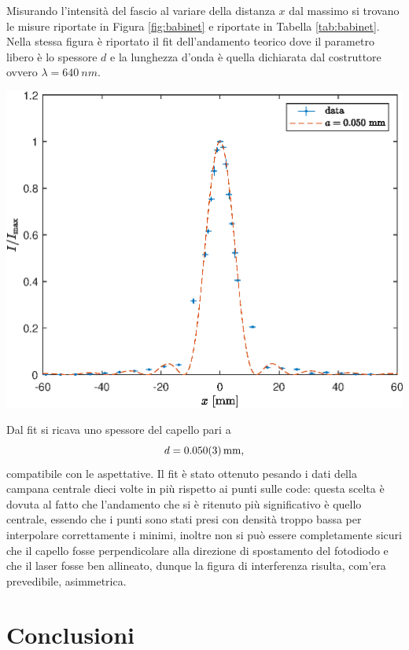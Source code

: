 \documentclass[10pt,oneside,a4paper]{article}
\newenvironment{Figure}
  {\par\medskip\noindent\minipage{\linewidth}}
  {\endminipage\par\medskip}
\begin{document}
\begin{multicols}{2}
Misurando l'intensità del fascio al variare della distanza $x$ dal massimo si trovano le misure riportate in Figura \ref{fig:babinet} e riportate in Tabella \ref{tab:babinet}. Nella stessa figura è riportato il fit dell'andamento teorico dove il parametro libero è lo spessore $d$ e la lunghezza d'onda è quella dichiarata dal costruttore ovvero $\lambda = \SI{640}{nm}$.
\begin{Figure}
	\begin{center}
	\includegraphics[width=\linewidth]{babinet.eps}
	\label{fig:babinet}
	\end{center}
\end{Figure}

Dal fit si ricava uno spessore del capello pari a 
\[
	d = \SI{0.050 \pm 0.003}{mm},
\]
compatibile con le aspettative.
Il fit è stato ottenuto pesando i dati della campana centrale dieci volte in più rispetto ai punti sulle code: questa scelta è dovuta al fatto che l'andamento che si è ritenuto più significativo è quello centrale, essendo che i punti sono stati presi con densità troppo bassa per interpolare correttamente i minimi, inoltre non si può essere completamente sicuri che il capello fosse perpendicolare alla direzione di spostamento del fotodiodo e che il laser fosse ben allineato, dunque la figura di interferenza risulta, com'era prevedibile, asimmetrica.

\section{Conclusioni}




\end{multicols}
\end{document}
